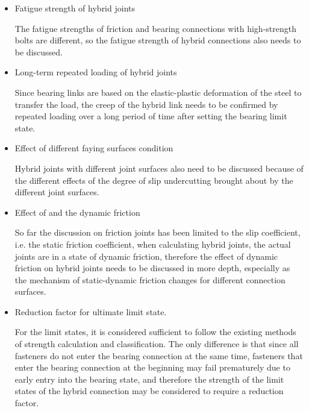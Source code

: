 \begin{itemize}

\renewcommand\labelitemi{\faSearch}

\item Fatigue strength of hybrid joints

The fatigue strengths of friction and bearing connections with high-strength bolts are different, so the fatigue strength of hybrid connections also needs to be discussed.

\item Long-term repeated loading of hybrid joints

Since bearing links are based on the elastic-plastic deformation of the steel to transfer the load, the creep of the hybrid link needs to be confirmed by repeated loading over a long period of time after setting the bearing limit state.

\item Effect of different faying surfaces condition

Hybrid joints with different joint surfaces also need to be discussed because of the different effects of the degree of slip undercutting brought about by the different joint surfaces.

\item Effect of and the dynamic friction

So far the discussion on friction joints has been limited to the slip coefficient, i.e. the static friction coefficient, when calculating hybrid joints, the actual joints are in a state of dynamic friction, therefore the effect of dynamic friction on hybrid joints needs to be discussed in more depth, especially as the mechanism of static-dynamic friction changes for different connection surfaces.

\item Reduction factor for ultimate limit state.

For the limit states, it is considered sufficient to follow the existing methods of strength calculation and classification. The only difference is that since all fasteners do not enter the bearing connection at the same time, fasteners that enter the bearing connection at the beginning may fail prematurely due to early entry into the bearing state, and therefore the strength of the limit states of the hybrid connection may be considered to require a reduction factor.

\end{itemize}
